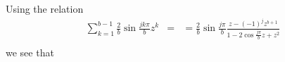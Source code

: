 \documentclass{article}
\begin{document}
Using the relation
\begin{align}
∑_{k=1}^{b-1} \frac{2}{b} \sin \frac{jkπ}{b} z^k
&=
&= \frac{2}{b} \sin \frac{jπ}{b} \frac{z-(-1)^j z^{b+1}}
	{1-2\cos \frac{jπ}{b} z + z^2}\\
\end{align}
we see that
\end{document}
